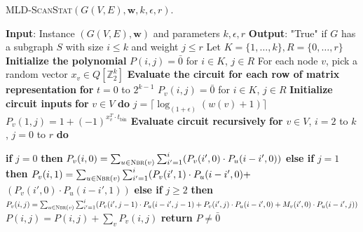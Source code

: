 \begin{algorithm}{}
\small
\caption{\small \textsc{MLD-ScanStat}$(G(V, E), \mathbf{w}, k, \epsilon, r)$.}
\label{alg:mld-scanstat}
\begin{algorithmic}[1]
\STATE \textbf{Input}: Instance $(G(V, E), \mathbf{w})$ and parameters $k, \epsilon, r$
\STATE\textbf{Output}: "True" if $G$ has a subgraph $S$ with size $i \leq k$ and weight $j \leq r$
\STATE Let $K=\{1,\ldots,k\}, R=\{0, \ldots, r\}$
\STATE \textbf{Initialize the polynomial}
\STATE $P(i, j) = \bar{0}$ for $i \in K$, $j \in R$
\STATE For each node $v$, pick a random vector $x_v \in Q[\mathbb{Z}_{2}^k]$
\STATE \textbf{Evaluate the circuit for each row of matrix representation}
\STATE \textbf{for} $t = 0$ to $2^{k-1}$
\STATE \quad $P_v(i, j) = \bar{0}$ for $i \in K$, $j \in R$
\STATE \quad \textbf{Initialize circuit inputs}
\STATE \quad \textbf{for} $v \in V$ \textbf{do}
\STATE \quad \quad $j = \lceil \log_{(1+\epsilon)}(w(v) + 1)\rceil$
\STATE \quad \quad $P_v(1, j) = 1 + (-1)^{x_v^T \cdot t_{\text{bin}}}$
\STATE \quad \textbf{Evaluate circuit recursively}
\STATE \quad \textbf{for} $v \in V$, $i = 2$ to $k$, $j = 0$ to $r$ \textbf{do}

\STATE \qquad \textbf{if} $j=0$ \textbf{then}
\STATE \qquad \quad $P_v(i,0) = \sum_{u \in \textsc{Nbr}(v)} \sum_{i' = 1}^i (P_v(i',0) \cdot P_u(i-i', 0))$
\STATE \qquad \textbf{else if} $j=1$ \textbf{then}
\STATE \qquad \quad
$P_v(i,1) = \sum_{u \in \textsc{Nbr}(v)} \sum_{i' = 1}^i (P_v(i', 1) \cdot P_u(i-i', 0) +$
\STATE \qquad \quad \quad \quad \quad \quad \quad $(P_v(i', 0) \cdot P_u(i-i', 1))$
\STATE \qquad \textbf{else if} $j\geq 2$ \textbf{then}
\STATE \qquad \quad
$P_v(i,j) = \sum_{u \in \textsc{Nbr}(v)} \sum_{i' = 1}^i (P_v(i', j - 1) \cdot P_u(i-i', j - 1) + P_v(i', j) \cdot P_u(i-i', 0) + M_v(i', 0) \cdot P_u(i-i', j))$
\STATE
\STATE \quad $P(i,j) = P(i, j) + \sum_v P_v(i,j)$ 
\STATE
\STATE \textbf{return} $P \neq \bar 0$
\end{algorithmic}
\end{algorithm}


